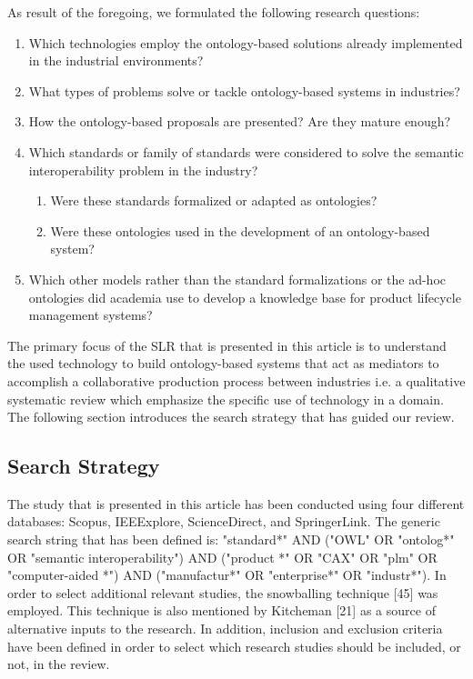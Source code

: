 \documentclass[peerreview]{IEEEtran}
\begin{document}
As result of the foregoing, we formulated the following research questions:

\begin{enumerate}
\item Which technologies employ the ontology-based solutions already implemented in the industrial environments?
\item What types of problems solve or tackle ontology-based systems in industries?
\item How the ontology-based proposals are presented? Are they mature enough? 
\item Which standards or family of standards were considered to solve the semantic interoperability problem in the industry?
\begin{enumerate}
\item Were these standards formalized or adapted as ontologies?
\item Were these ontologies used in the development of an ontology-based system?
\end{enumerate}
\item Which other models rather than the standard formalizations or the ad-hoc ontologies did academia use to develop a knowledge base for product lifecycle management systems?
\end{enumerate}


The primary focus of the SLR that is presented in this article is to understand the used technology to build ontology-based systems that act as mediators to accomplish a collaborative production process between industries i.e. a qualitative systematic review which emphasize the specific use of technology in a domain.  The following section introduces the search strategy that has guided our review.


\subsection{Search Strategy}


The study that is presented in this article has been conducted using four different databases: Scopus, IEEExplore, ScienceDirect, and SpringerLink. The generic search string that has been defined is: "standard*" AND ("OWL" OR "ontolog*" OR "semantic interoperability") AND ("product *" OR "CAX" OR "plm" OR "computer-aided *") AND ("manufactur*" OR "enterprise*" OR "industr*"). In order to select additional relevant studies, the snowballing technique [45] was employed. This technique is also mentioned by Kitcheman [21] as a source of alternative inputs to the research. In addition, inclusion and exclusion criteria have been defined in order to select which research studies should be included, or not, in the review.  
\end{document}
